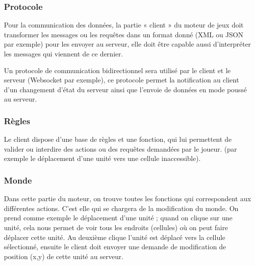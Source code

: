 \documentclass[a4paper,10pt]{report}
\begin{document}
      \subsubsection{Protocole}

	Pour la communication des données, la partie « client » du moteur de jeux doit transformer les messages ou les requêtes dans un format donné (XML ou JSON par exemple) pour les envoyer au serveur, elle doit être capable aussi d’interpréter les messages qui viennent de ce dernier.

	Un protocole de communication bidirectionnel sera utilisé par le client et le serveur (Websocket par exemple), ce protocole permet la notification au client d’un changement d’état du serveur ainsi que l’envoie de données en mode poussé au serveur.

      \subsubsection{Règles}

	Le client dispose d’une base de règles et une fonction, qui lui permettent de valider ou interdire des actions ou des requêtes demandées par le joueur. (par exemple le déplacement d’une unité vers une cellule inaccessible).

      \subsubsection{Monde}

	Dans cette partie du moteur, on trouve toutes les fonctions qui correspondent aux différentes actions. C'est elle qui se chargera de la modification du monde. On prend comme exemple le déplacement d’une unité ; quand on clique sur une unité, cela nous permet de voir tous les endroits (cellules) où on peut faire déplacer cette unité. Au deuxième clique l’unité est déplacé vers la cellule sélectionné, ensuite le client doit envoyer une demande de modification de position (x,y) de cette unité au serveur.
\end{document}
